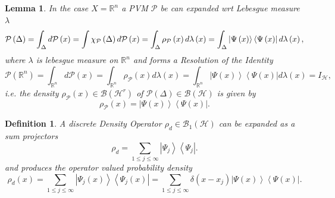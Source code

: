 \documentclass[aps,preprint]{revtex4}%
\newtheorem{definition}[theorem]{Definition}
\newtheorem{lemma}[theorem]{Lemma}
\begin{document}
\begin{lemma}
In the case $X=\mathbb{R}^{n}$ a PVM $\mathcal{P}$ be can expanded wrt
Lebesgue measure $\mathcal{\lambda}$
\begin{equation}
\mathcal{P}\left(  \Delta\right)  =\int_{\Delta}d\mathcal{P}\left(  x\right)
=\int{\large \chi}_{\mathcal{P}}\left(  \Delta\right)  d\mathcal{P}\left(
x\right)  =\int_{\Delta}\rho_{\mathcal{P}}\left(  x\right)  d\mathcal{\lambda
}\left(  x\right)  =\int_{\Delta}\left\vert \Psi\left(  x\right)
\right\rangle \left\langle \Psi\left(  x\right)  \right\vert d\mathcal{\lambda
}\left(  x\right)  ,
\end{equation}
where $\mathcal{\lambda}$ is lebesgue measure on $\mathbb{R}^{n}$ and forms a
\emph{Resolution of the Identity}%
\begin{equation}
\mathcal{P}\left(  \mathbb{R}^{n}\right)  =\int_{\mathbb{R}^{n}}%
d\mathcal{P}\left(  x\right)  =\int_{\mathbb{R}^{n}}\rho_{\mathcal{P}}\left(
x\right)  d\mathcal{\lambda}\left(  x\right)  =\int_{\mathbb{R}^{n}}\left\vert
\Psi\left(  x\right)  \right\rangle \left\langle \Psi\left(  x\right)
\right\vert d\mathcal{\lambda}\left(  x\right)  =I_{\mathcal{H}},
\end{equation}
i.e. the density $\rho_{\mathcal{P}}\left(  x\right)  \in\mathcal{B}\left(
\mathcal{H}^{r}\right)  $ of $\mathcal{P}\left(  \Delta\right)  \in
\mathcal{B}\left(  \mathcal{H}\right)  $ is given by
\begin{equation}
\rho_{\mathcal{P}}\left(  x\right)  =\left\vert \Psi\left(  x\right)
\right\rangle \left\langle \Psi\left(  x\right)  \right\vert .
\end{equation}

\end{lemma}

\begin{definition}
A \emph{discrete Density Operator} $\rho_{d}\in\mathcal{B}_{1}\left(
\mathcal{H}\right)  $ can be expanded as a sum projectors
\begin{equation}
\rho_{d}=\sum_{1\leq j\leq\infty}\left\vert \Psi_{j}\right\rangle \left\langle
\Psi_{j}\right\vert .
\end{equation}
and produces the operator valued probability density
\begin{equation}
\rho_{d}\left(  x\right)  =\sum_{1\leq j\leq\infty}\left\vert \Psi_{j}\left(
x\right)  \right\rangle \left\langle \Psi_{j}\left(  x\right)  \right\vert
=\sum_{1\leq j\leq\infty}\delta\left(  x-x_{j}\right)  \left\vert \Psi\left(
x\right)  \right\rangle \left\langle \Psi\left(  x\right)  \right\vert .
\end{equation}

\end{definition}
\end{document}

